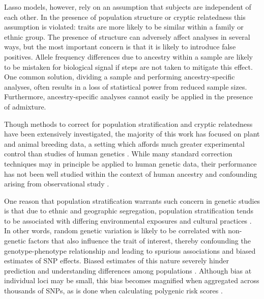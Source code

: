 Lasso models, however, rely on an assumption that subjects are independent of each other. In the presence of population structure or cryptic relatedness this assumption is violated: traits are more likely to be similar within a family or ethnic group. The presence of structure can adversely affect analyses in several ways, but the most important concern is that it is likely to introduce false positives. Allele frequency differences due to ancestry within a sample are likely to be mistaken for biological signal if steps are not taken to mitigate this effect. One common solution, dividing a sample and performing ancestry-specific analyses, often results in a loss of statistical power from reduced sample sizes. Furthermore, ancestry-specific analyses cannot easily be applied in the presence of admixture.

Though methods to correct for population stratification and cryptic relatedness have been extensively investigated, the majority of this work has focused on plant and animal breeding data, a setting which affords much greater experimental control than studies of human genetics \citep{Amin2007, hoffman2013correcting, price2006principal, rakitsch2013lasso, bhatnagar2020simultaneous, Sillanpaeae2011}. While many standard correction techniques may in principle be applied to human genetic data, their performance has not been well studied within the context of human ancestry and confounding arising from observational study \citep{lawson2019population, barton2019population}.

One reason that population stratification warrants such concern in genetic studies is that due to ethnic and geographic segregation, population stratification tends to be associated with differing environmental exposures and cultural practices \citep{thornton2015statistical, browning2011population}. In other words, random genetic variation is likely to be correlated with non-genetic factors that also influence the trait of interest, thereby confounding the genotype-phenotype relationship and leading to spurious associations and biased estimates of SNP effects. Biased estimates of this nature severely hinder prediction and understanding differences among populations \citep{barton2019population}. Although bias at individual loci may be small, this bias becomes magnified when aggregated across thousands of SNPs, as is done when calculating polygenic risk scores \citep{barton2019population, peterson2019genome}.

